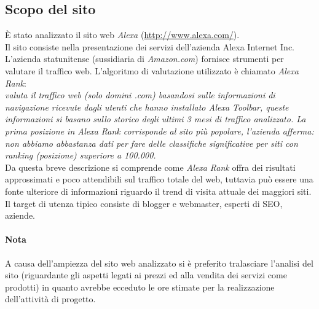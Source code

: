 \subsection{Scopo del sito}\label{scopo}
È stato analizzato il sito web \textit{Alexa} (\url{http://www.alexa.com/}). \\
Il sito consiste nella presentazione dei servizi dell'azienda Alexa Internet Inc. \\
L'azienda statunitense (sussidiaria di \textit{Amazon.com}) fornisce 
strumenti per valutare il traffico web. L'algoritmo di valutazione utilizzato è chiamato \textit{Alexa Rank}: \\
\textit{valuta il traffico web (solo domini .com) basandosi sulle informazioni di navigazione ricevute dagli utenti che 
hanno installato Alexa Toolbar, queste informazioni si basano sullo 
storico degli ultimi 3 mesi di traffico analizzato.
La prima posizione in Alexa Rank corrisponde al sito più popolare, 
l'azienda afferma: non abbiamo abbastanza dati per fare delle classifiche 
significative per siti con ranking (posizione) superiore a 100.000.} \\
Da questa breve descrizione si comprende come \textit{Alexa Rank} offra dei risultati approssimati e poco attendibili sul traffico totale del web, tuttavia può 
essere una fonte ulteriore di informazioni riguardo il trend di visita attuale dei maggiori siti.\\ 
Il target di utenza tipico consiste di blogger e webmaster, esperti di SEO, 
aziende.\\
\paragraph{Nota}
 A causa dell'ampiezza del sito web analizzato si è preferito tralasciare l'analisi  del sito (riguardante gli aspetti
legati ai prezzi ed alla vendita dei servizi come prodotti) in quanto 
avrebbe ecceduto le ore stimate per la realizzazione dell'attività di progetto.
